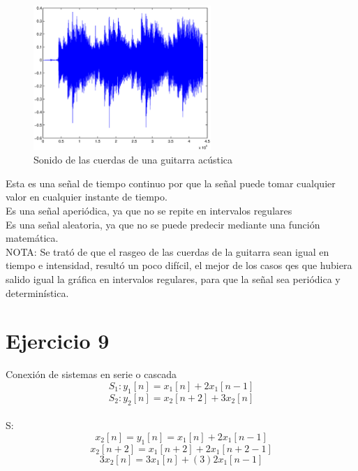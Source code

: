 \documentclass[10pt,a4paper]{report}
\begin{document}
\begin{itemize}
\begin{figure}[H]
\centering
\includegraphics[width=0.6\textwidth]{GuitarGraphic}
\caption{Sonido de las cuerdas de una guitarra acústica}
\label{fig:GuitarGraphic}
\end{figure}

Esta es una señal de tiempo continuo por que la señal puede tomar cualquier valor en cualquier instante de tiempo. \\
Es una señal aperiódica, ya que no se repite en intervalos regulares \\
Es una señal aleatoria, ya que no se puede predecir mediante una función matemática.\\
NOTA: Se trató de que el rasgeo de las cuerdas de la guitarra sean igual en tiempo e intensidad, resultó un poco difícil, el mejor de los casos qes que hubiera salido igual la gráfica en intervalos regulares, para que la señal sea periódica y determinística.

\end{itemize}

\section{Ejercicio 9}

Conexión de sistemas en serie o cascada\\
\[
S_{1}: y_{1}\left [ n \right ]=x_{1}\left [ n \right ]+2x_{1}\left [ n-1 \right ]
\]
\[
S_{2}: y_{2}\left [ n \right ]=x_{2}\left [ n+2 \right ]+3x_{2}\left [ n \right ]
\]\\

S:\\
\[
x_{2}\left [ n \right ]=y_{1}\left [ n \right ]=x_{1}\left [ n \right ]+2x_{1}\left [ n-1 \right ]
\]
\[
x_{2}\left [ n+2 \right ]=x_{1}\left [ n+2 \right ]+2x_{1}\left [ n+2-1 \right ]
\]
\[
3x_{2}\left [ n \right ]=3x_{1}\left [ n \right ]+(3)2x_{1}\left [ n-1 \right ]
\]\\
\end{document}
